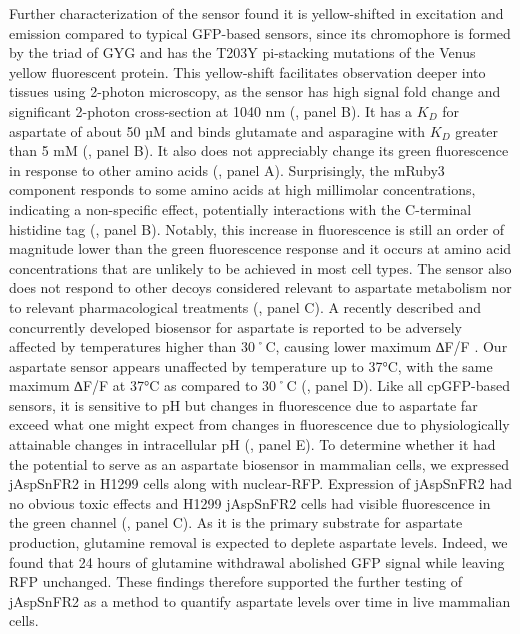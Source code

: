 \documentclass[9pt,lineno]{elife}
\begin{document}
Further characterization of the sensor found it is yellow-shifted in excitation and emission compared to typical GFP-based sensors, since its chromophore is formed by the triad of GYG and has the T203Y pi-stacking mutations of the Venus yellow fluorescent protein.
This yellow-shift facilitates observation deeper into tissues using 2-photon microscopy, as the sensor has high signal fold change and significant 2-photon cross-section at 1040 nm (, panel B).
It has a $K_D$ for aspartate of about 50 µM and binds glutamate and asparagine with $K_D$ greater than 5 mM (, panel B).
It also does not appreciably change its green fluorescence in response to other amino acids (, panel A).
Surprisingly, the mRuby3 component responds to some amino acids at high millimolar concentrations, indicating a non-specific effect, potentially interactions with the C-terminal histidine tag (, panel B).
Notably, this increase in fluorescence is still an order of magnitude lower than the green fluorescence response and it occurs at amino acid concentrations that are unlikely to be achieved in most cell types.
The sensor also does not respond to other decoys considered relevant to aspartate metabolism nor to relevant pharmacological treatments (, panel C).
A recently described and concurrently developed biosensor for aspartate is reported to be adversely affected by temperatures higher than 30˚C, causing lower maximum ∆F/F \citep{Hellweg2023}.
Our aspartate sensor appears unaffected by temperature up to 37°C, with the same maximum ∆F/F at 37°C as compared to 30˚C (, panel D).
Like all cpGFP-based sensors, it is sensitive to pH but changes in fluorescence due to aspartate far exceed what one might expect from changes in fluorescence due to physiologically attainable changes in intracellular pH (, panel E).
To determine whether it had the potential to serve as an aspartate biosensor in mammalian cells, we expressed jAspSnFR2 in H1299 cells along with nuclear-RFP.
Expression of jAspSnFR2 had no obvious toxic effects and H1299 jAspSnFR2 cells had visible fluorescence in the green channel (, panel C).
As it is the primary substrate for aspartate production, glutamine removal is expected to deplete aspartate levels.
Indeed, we found that 24 hours of glutamine withdrawal abolished GFP signal while leaving RFP unchanged.
These findings therefore supported the further testing of jAspSnFR2 as a method to quantify aspartate levels over time in live mammalian cells.
\end{document}

